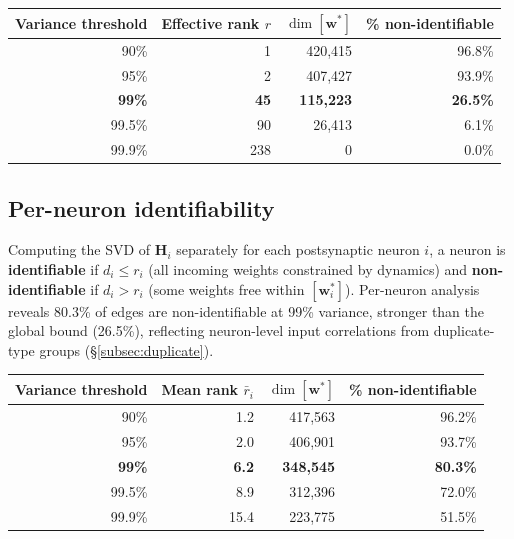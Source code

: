 \documentclass[11pt,a4paper]{article}
\begin{document}
\begin{center}
\begin{tabular}{rrrr}
\toprule
Variance threshold & Effective rank $r$ & $\dim[\mathbf{w}^*]$ & \% non-identifiable \\
\midrule
90\%  & 1   & 420,415 & 96.8\% \\
95\%  & 2   & 407,427 & 93.9\% \\
\textbf{99\%}  & \textbf{45}  & \textbf{115,223} & \textbf{26.5\%} \\
99.5\% & 90  & 26,413  & 6.1\%  \\
99.9\% & 238 & 0       & 0.0\%  \\
\bottomrule
\end{tabular}
\end{center}

\subsection{Per-neuron identifiability}

Computing the SVD of $\mathbf{H}_i$ separately for each postsynaptic neuron $i$,
a neuron is \textbf{identifiable} if $d_i \leq r_i$ (all incoming weights
constrained by dynamics) and \textbf{non-identifiable} if $d_i > r_i$ (some
weights free within $[\mathbf{w}_i^*]$). Per-neuron analysis reveals 80.3\% of
edges are non-identifiable at 99\% variance, stronger than the global bound
(26.5\%), reflecting neuron-level input correlations from duplicate-type groups
(\S\ref{subsec:duplicate}).

\begin{center}
\begin{tabular}{rrrr}
\toprule
Variance threshold & Mean rank $\bar{r}_i$ & $\dim[\mathbf{w}^*]$ & \% non-identifiable \\
\midrule
90\%  & 1.2 & 417,563 & 96.2\% \\
95\%  & 2.0 & 406,901 & 93.7\% \\
\textbf{99\%}  & \textbf{6.2}  & \textbf{348,545} & \textbf{80.3\%} \\
99.5\% & 8.9 & 312,396 & 72.0\% \\
99.9\% & 15.4 & 223,775 & 51.5\% \\
\bottomrule
\end{tabular}
\end{center}
\end{document}
